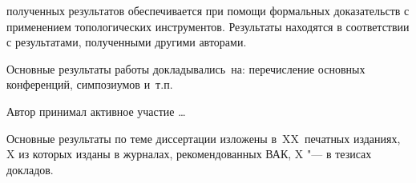 {\reliability} полученных результатов обеспечивается при помощи формальных доказательств с применением топологических инструментов. Результаты находятся в соответствии с результатами, полученными другими авторами.


{\probation}
Основные результаты работы докладывались~на:
перечисление основных конференций, симпозиумов и~т.\:п.

{\contribution} Автор принимал активное участие \ldots

{%
    {\publications} Основные результаты по теме диссертации изложены
    в~XX~печатных изданиях,
    X из которых изданы в журналах, рекомендованных ВАК,
    X "--- в тезисах докладов.
}%
